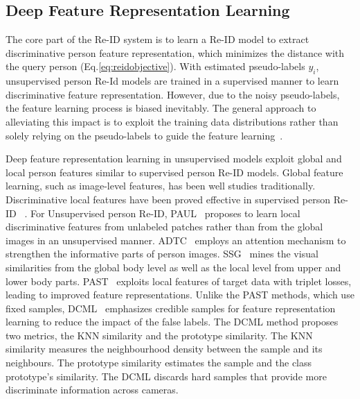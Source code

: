 \documentclass[a4paper,fleqn]{cas-dc}
\begin{document}
\subsection{Deep Feature Representation Learning}
The core part of the Re-ID system is to learn a Re-ID model to extract discriminative person feature representation, which minimizes the distance with the query person (Eq.\ref{eq:reidobjective}). With estimated pseudo-labels $y_i$, unsupervised person Re-Id models are trained in a supervised manner to learn discriminative feature representation. However, due to the noisy pseudo-labels, the feature learning process is biased inevitably. The general approach to alleviating this impact is to exploit the training data distributions rather than solely relying on the pseudo-labels to guide the feature learning~\cite{wang_unsupervised_2020,xiang_second-order_2020,zhai_ad-cluster_2020,zeng_hierarchical_2020}.

Deep feature representation learning in unsupervised models exploit global and local person features similar to supervised person Re-ID models. Global feature learning, such as image-level features, has been well studies traditionally. Discriminative local features have been proved effective in supervised person Re-ID ~\cite{zhao_deeply-learned_2017,xiang_part-aware_2020,guo_beyond_2019}. For Unsupervised person Re-ID,  PAUL~\cite{yang_patch-based_2019} proposes to learn local discriminative features from unlabeled patches rather than from the global images in an unsupervised manner. ADTC~\cite{vedaldi_attention-driven_2020} employs an attention mechanism to strengthen the informative parts of person images. SSG~\cite{fu_self-similarity_2019} mines the visual similarities from the global body level as well as the local level from upper and lower body parts. PAST~\cite{zhang_self-training_2019} exploits local features of target data with triplet losses, leading to improved feature representations. Unlike the PAST methods, which use fixed samples, DCML~\cite{vedaldi_deep_2020} emphasizes credible samples for feature representation learning to reduce the impact of the false labels. The DCML method proposes two metrics, the KNN similarity and the prototype similarity. The KNN similarity measures the neighbourhood density between the sample and its neighbours. The prototype similarity estimates the sample and the class prototype's similarity. The DCML discards hard samples that provide more discriminate information across cameras.  
\end{document}
